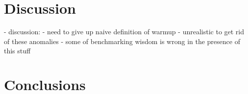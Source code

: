 \documentclass[10pt,preprint]{sigplanconf}
\begin{document}
\section{Discussion}
\label{sec:Discussion}

  - discussion:
    - need to give up naive definition of warmup
    - unrealistic to get rid of these anomalies
    - some of benchmarking wisdom is wrong in the presence of this stuff

\section{Conclusions}
\label{sec:conclusion}



\end{document}
